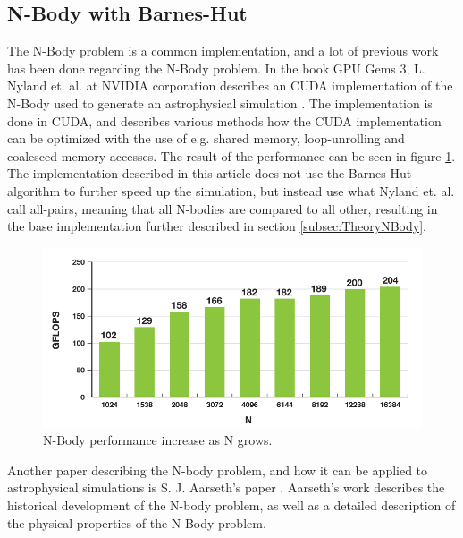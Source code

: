 \subsection{N-Body with Barnes-Hut}
The N-Body problem is a common implementation, and a lot of previous work has been done regarding the N-Body problem. In the book GPU Gems 3, L. Nyland et. al. at NVIDIA corporation describes an CUDA implementation of the N-Body used to generate an astrophysical simulation \cite{nyland2007fast}. The implementation is done in CUDA, and describes various methods how the CUDA implementation can be optimized with the use of e.g. shared memory, loop-unrolling and coalesced memory accesses. The result of the performance can be seen in figure \ref{fig:GPUGemsNBodyPerformance}. The implementation described in this article does not use the Barnes-Hut algorithm to further speed up the simulation, but instead use what Nyland et. al. call all-pairs, meaning that all N-bodies are compared to all other, resulting in the base implementation further described in section \ref{subsec:TheoryNBody}. 

\begin{figure}[!htpb]
    \centering
    \includegraphics[width=\textwidth]{Introduction/Figs/GPUGemsNBodyComparison.png}
    \caption{N-Body performance increase as N grows. \cite{nyland2007fast}}
    \label{fig:GPUGemsNBodyPerformance}
\end{figure}

Another paper describing the N-body problem, and how it can be applied to astrophysical simulations is S. J. Aarseth's paper \cite{aarseth2003gravitational}. Aarseth's work describes the historical development of the N-body problem, as well as a detailed description of the physical properties of the N-Body problem.


